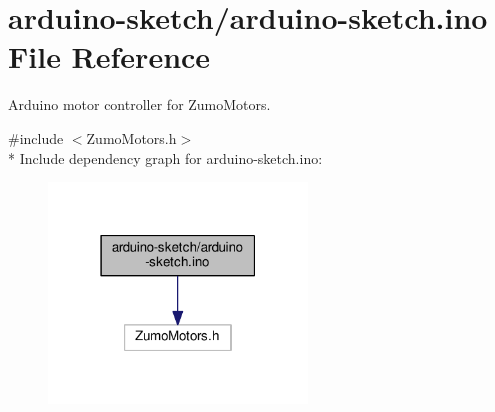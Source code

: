 \hypertarget{arduino-sketch_8ino}{\section{arduino-\/sketch/arduino-\/sketch.ino File Reference}
\label{arduino-sketch_8ino}
}


Arduino motor controller for Zumo\+Motors.  


{\ttfamily \#include $<$Zumo\+Motors.\+h$>$}\\*
Include dependency graph for arduino-\/sketch.ino\+:\nopagebreak
\begin{figure}[H]
\begin{center}
\leavevmode
\includegraphics[width=195pt]{arduino-sketch_8ino__incl}
\end{center}
\end{figure}

